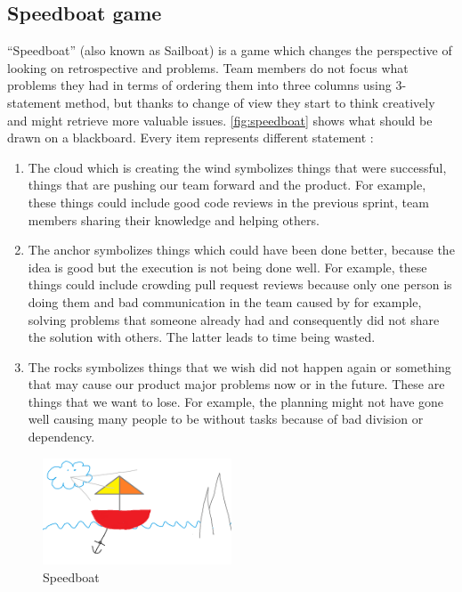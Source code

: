 \subsection{Speedboat game}
\label{subch:speedboatGame}
“Speedboat” (also known as Sailboat) is a game which changes the perspective of looking on retrospective and problems. Team members do not focus what problems they had in terms of ordering them into three columns using 3-statement method, but thanks to change of view they start to think creatively and might retrieve more valuable issues. \autoref{fig:speedboat} shows what should be drawn on a blackboard. Every item represents different statement \cite{SpeedboatBibliography}:
\begin{enumerate}
    \item The cloud which is creating the wind symbolizes things that were successful, things that are pushing our team forward and the product. For example, these things could include good code reviews in the previous sprint, team members sharing their knowledge and helping others.
    \item The anchor symbolizes things which could have been done better, because the idea is good but the execution is not being done well. For example, these things could include crowding pull request reviews because only one person is doing them and bad communication in the team caused by for example, solving problems that someone already had and consequently did not share the solution with others. The latter leads to time being wasted.
    \item The rocks symbolizes things that we wish did not happen again or something that may cause our product major problems now or in the future. These are things that we want to lose. For example, the planning might not have gone well causing many people to be without tasks because of bad division or dependency.
\end{enumerate}

\begin{figure}[h]
\caption{Speedboat}
\label{fig:speedboat}
\centering
\includegraphics[width=0.5\textwidth]{img/speedboat}
\end{figure}


